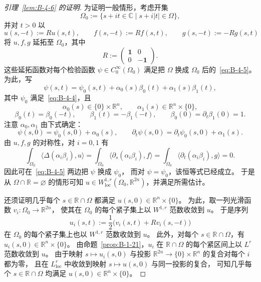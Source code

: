 \begin{proof}[引理~\ref{lem:B-4-6} 的证明]
为证明一般情形，考虑开集
\[
  \Omega_0:=\{s+it\in\mathbb C\mid s+i|t|\in\Omega\},
\]
并对 $t>0$ 以
\[
  u(s,-t):=Ru(s,t),\qquad f(s,-t):=Rf(s,t),\qquad
  g(s,-t):=-Rg(s,t)
\]
将 $u,f,g$ 延拓至 $\Omega_0$，其中
\[
  R:=\begin{pmatrix}\mathbf 1&0\\0&-\mathbf 1\end{pmatrix}.
\]
这些延拓函数对每个检验函数 $\psi\in C_0^\infty(\Omega_0)$
满足把 $\Omega$ 换成 $\Omega_0$ 后的~\eqref{eq:B-4-5}。
为此，写
\[
  \psi(s,t)=\psi_0(s,t)+\alpha_0(s)\beta_0(t)+\alpha_1(s)\beta_1(t),
\]
其中 $\psi_0$ 满足~\eqref{eq:B-4-4}，且
\[
  \alpha_0(s)\in\{0\}\times\mathbb R^n,\qquad
  \alpha_1(s)\in\mathbb R^n\times\{0\},
\]
\[
  \beta_0(t)=\beta_0(-t),\qquad
  \beta_1(t)=-\beta_1(-t),\qquad
  \beta_0(0)=\partial_t\beta_1(0)=1.
\]
注意 $\alpha_0,\alpha_1$ 由下式确定：
\[
  \psi(s,0)=\psi_0(s,0)+\alpha_0(s),\qquad
  \partial_t\psi(s,0)=\partial_t\psi_0(s,0)+\alpha_1(s).
\]
由 $u,f,g$ 的对称性，对 $i=0,1$ 有
\[
  \int_{\Omega_0}\langle\Delta(\alpha_i\beta_i),u\rangle
  =\int_{\Omega_0}\langle\partial_s(\alpha_i\beta_i),f\rangle
  =\int_{\Omega_0}\langle\partial_t(\alpha_i\beta_i),g\rangle=0.
\]
因此可在~\eqref{eq:B-4-5} 两边把 $\psi$ 换成 $\psi_0$，
而对 $\psi=\psi_0$，该恒等式已经成立。
于是从 $\Omega\cap\mathbb R=\varnothing$ 的情形可知
$u\in W^{1,r}_{\mathrm{loc}}(\Omega_0,\mathbb R^{2n})$，并满足所需估计。

还须证明几乎每个 $s\in\mathbb R\cap\Omega$ 都满足
$u(s,0)\in\mathbb R^n\times\{0\}$。
为此，取一列光滑函数 $v_i:\Omega_0\to\mathbb R^{2n}$，
使其在 $\Omega_0$ 的每个紧子集上以 $W^{1,r}$ 范数收敛到 $u$。
于是序列
\[
  u_i(s,t):=\frac12\bigl(v_i(s,t)+Rv_i(s,-t)\bigr)
\]
在 $\Omega_0$ 的每个紧子集上也以 $W^{1,r}$ 范数收敛到 $u$。
此外，对每个 $s\in\mathbb R\cap\Omega$，有
$u_i(s,0)\in\mathbb R^n\times\{0\}$。
由命题~\ref{prop:B-1-21}，$u_i$ 在 $\mathbb R\cap\Omega$
的每个紧区间上以 $L^r$ 范数收敛到 $u$。
由于映射 $s\mapsto u_i(s,0)$ 与投影
$\mathbb R^{2n}\to\{0\}\times\mathbb R^n$ 的复合对每个 $i$ 都为零，
且在 $L^r_{\mathrm{loc}}$ 中收敛到映射
$s\mapsto u(s,0)$ 与同一投影的复合，
可知几乎每个 $s\in\mathbb R\cap\Omega$ 均满足
$u(s,0)\in\mathbb R^n\times\{0\}$。
\end{proof}

